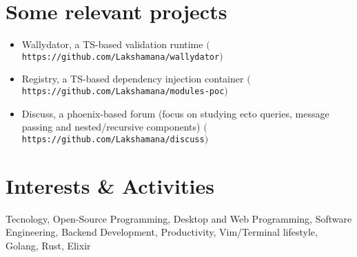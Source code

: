 \documentclass[a4paper,10pt]{article}
\begin{document}
\section{Some relevant projects}
\begin{flushleft}
\begin{itemize}
  \item Wallydator, a TS-based validation runtime $($\texttt{https://github.com/Lakshamana/wallydator}$)$
  \item Registry, a TS-based dependency injection container $($\texttt{https://github.com/Lakshamana/modules-poc}$)$
  \item Discuss, a phoenix-based forum (focus on studying ecto queries, message passing and nested/recursive components) $($\texttt{https://github.com/Lakshamana/discuss}$)$
\end{itemize}
\end{flushleft}

\section{Interests \& Activities}
\raggedright{Tecnology, Open-Source Programming, Desktop and Web Programming, Software Engineering, Backend Development, Productivity, Vim/Terminal lifestyle, Golang, Rust, Elixir}

\end{document}
